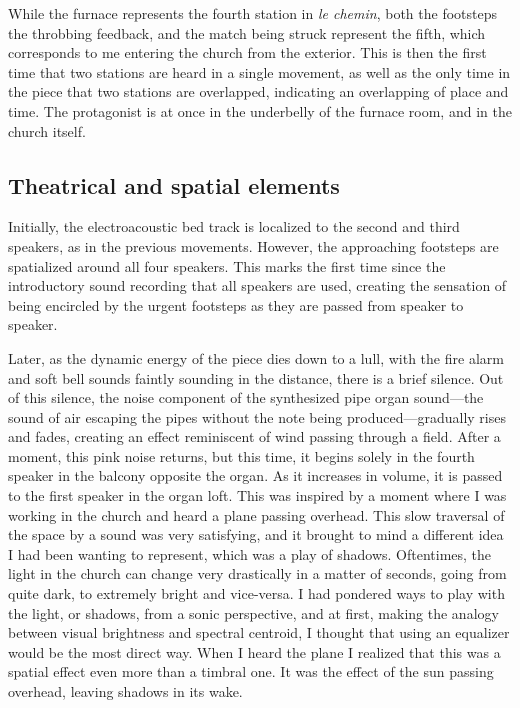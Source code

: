 \documentclass[12pt,twoside,maitrise]{dms_ks}
\theoremstyle{definition}
\begin{document}
{While the furnace represents the fourth station in \textit{le chemin}, both the footsteps the throbbing feedback, and the match being struck represent the fifth, which corresponds to me entering the church from the exterior. 
This is then the first time that two stations are heard in a single movement, as well as the only time in the piece that two stations are overlapped, indicating an overlapping of place and time. 
The protagonist is at once in the underbelly of the furnace room, and in the church itself. 


\subsection{Theatrical and spatial elements}

Initially, the electroacoustic bed track is localized to the second and third speakers, as in the previous movements. 
However, the approaching footsteps are spatialized around all four speakers. 
This marks the first time since the introductory sound recording that all speakers are used, creating the sensation of being encircled by the urgent footsteps as they are passed from speaker to speaker.

Later, as the dynamic energy of the piece dies down to a lull, with the fire alarm and soft bell sounds faintly sounding in the distance, there is a brief silence. 
Out of this silence, the noise component of the synthesized pipe organ sound---the sound of air escaping the pipes without the note being produced---gradually rises and fades, creating an effect reminiscent of wind passing through a field. 
After a moment, this pink noise returns, but this time, it begins solely in the fourth speaker in the balcony opposite the organ. 
As it increases in volume, it is passed to the first speaker in the organ loft. 
This was inspired by a moment where I was working in the church and heard a plane passing overhead. 
This slow traversal of the space by a sound was very satisfying, and it brought to mind a different idea I had been wanting to represent, which was a play of shadows. 
Oftentimes, the light in the church can change very drastically in a matter of seconds, going from quite dark, to extremely bright and vice-versa. 
I had pondered ways to play with the light, or shadows, from a sonic perspective, and at first, making the analogy between visual brightness and spectral centroid, I thought that using an equalizer would be the most direct way. 
When I heard the plane I realized that this was a spatial effect even more than a timbral one. 
It was the effect of the sun passing overhead, leaving shadows in its wake.

}
\end{document}
